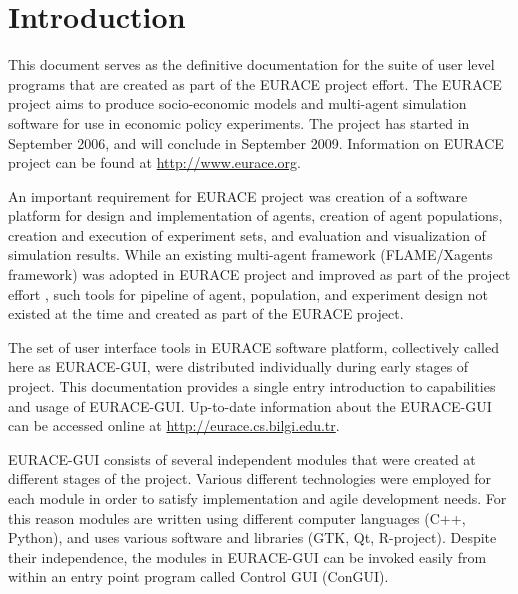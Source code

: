 \documentclass[urop]{socreport}
\begin{document}
\chapter{Introduction}
This document serves as the definitive documentation for the suite of user level programs that are created as part of the EURACE project effort. The EURACE project aims to produce socio-economic models and multi-agent simulation software for use in economic policy experiments. The project has started in September 2006, and will conclude in September 2009. Information on EURACE project can be found at \url{http://www.eurace.org}.

An important requirement for EURACE project was creation of a software platform for design and implementation of agents, creation of agent populations, creation and execution of experiment sets, and evaluation and visualization of simulation results. While an existing multi-agent framework (FLAME/Xagents framework) was adopted in EURACE project and improved as part of the project effort \citep{Greenough2007}, such tools for pipeline of agent, population, and experiment design not existed at the time and created as part of the EURACE project. 

The set of user interface tools in EURACE software platform, collectively called here as EURACE-GUI, were distributed individually during early stages of project. This documentation provides a single entry introduction to capabilities and usage of EURACE-GUI. Up-to-date information about the EURACE-GUI can be accessed online at \url{http://eurace.cs.bilgi.edu.tr}.

EURACE-GUI consists of several independent modules that were created at different stages of the project. Various different technologies were employed for each module in order to satisfy implementation and agile development needs. For this reason modules are written using different computer languages (C++, Python), and uses various software and libraries (GTK, Qt, R-project). Despite their independence, the modules in EURACE-GUI can be invoked easily from within an entry point program called Control GUI (ConGUI).
\end{document}
